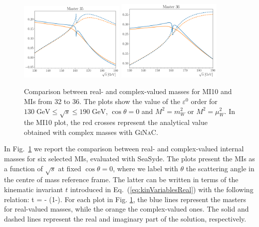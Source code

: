 \documentclass[final,1p,times]{elsarticle}
\begin{document}
\begin{figure}[ht!]
    \includegraphics[width=0.45\textwidth]{master35.pdf}
    \includegraphics[width=0.45\textwidth]{master36.pdf}
    \caption{Comparison between real- and complex-valued masses for MI10 and MIs from 32 to 36. The plots show the value of the $\varepsilon^0$ order  for $130 \; \text{GeV} \le \sqrt{s} \le 190\;\text{GeV}$, $\cos\theta=0$ and $M^2=m_W^2$ or $M^2=\mu_W^2$. 
    In the MI10 plot, the red crosses represent the analytical value obtained with complex masses with \textsc{GiNaC}.}
    \label{fig:compReCoMass}
\end{figure}

In Fig.~\ref{fig:compReCoMass} we report the comparison between real- and complex-valued internal masses for six selected MIs, evaluated with {\sc SeaSyde}.
The plots present the MIs as a function of $\sqrt{s}$ at fixed $\cos\theta=0$, where we label with $\theta$ the scattering angle in the centre of mass reference frame.
The latter can be written in terms of the kinematic invariant $t$ introduced in Eq.~(\ref{eq:kinVariablesReal}) with the following relation:
\be
    t = - \left(1-\cos\theta \right).
    \label{eq:relationTCostheta}
\ee
For each plot in Fig. \ref{fig:compReCoMass}, the blue lines represent the masters for real-valued masses, while the orange the complex-valued ones. The solid and dashed lines represent the real and imaginary part of the solution, respectively.
\end{document}
